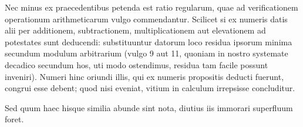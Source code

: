 Nec minus ex praecedentibus petenda est ratio regularum, quae ad verificationem operationum arithmeticarum vulgo commendantur. Scilicet si ex numeris datis alii per additionem, subtractionem, multiplicationem aut elevationem ad potestates sunt deducendi: substituuntur datorum loco residua ipsorum minima secundum modulum arbitrarium (vulgo 9 aut 11, quoniam in nostro systemate decadico secundum hos, uti modo ostendimus, residua tam facile possunt inveniri). Numeri hinc oriundi illis, qui ex numeris propositis deducti fuerunt, congrui esse debent; quod nisi eveniat, vitium in calculum irrepsisse concluditur.

Sed quum haec hisque similia abunde sint nota, diutius iis immorari superfluum foret.

\par\bigskip\bigskip{}
